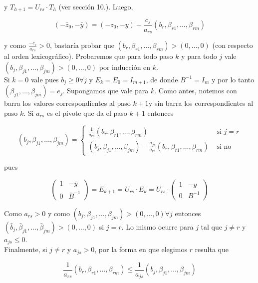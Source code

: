 \documentclass[10pt]{article}
\begin{document}
y $T_{h+1}=U_{r s} \cdot T_{h}$ (ver sección 10.). Luego,

$$
\left(-\bar{z}_{0},-\bar{y}\right)=\left(-z_{0},-y\right)-\frac{c_{s}}{a_{r s}}\left(b_{r}, \beta_{r 1}, \ldots, \beta_{r m}\right)
$$

y como $\frac{-c_{s}}{a_{r s}}>0$, bastaría probar que $\left(b_{r}, \beta_{r 1}, \ldots, \beta_{r m}\right)>(0, \ldots, 0)$ (con respecto al orden lexicográfico). Probaremos que para todo paso $k$ y para todo $j$ vale $\left(b_{j}, \beta_{j 1}, \ldots, \beta_{j m}\right)>(0, \ldots, 0)$ por inducción en $k$.\\
Si $k=0$ vale pues $b_{j} \geq 0 \forall j$ y $E_{k}=E_{0}=I_{m+1}$, de donde $B^{-1}=I_{m}$ y por lo tanto $\left(\beta_{j 1}, \ldots, \beta_{j m}\right)=e_{j}$. Supongamos que vale para $k$. Como antes, notemos con barra los valores correspondientes al paso $k+1 \mathrm{y}$ sin barra los correspondientes al paso $k$. Si $a_{r s}$ es el pivote que da el paso $k+1$ entonces

$$
\left(\bar{b}_{j}, \bar{\beta}_{j 1}, \ldots, \bar{\beta}_{j m}\right)= \begin{cases}\frac{1}{a_{r s}}\left(b_{r}, \beta_{r 1}, \ldots, \beta_{r m}\right) & \text { si } j=r \\ \left(b_{j}, \beta_{j 1}, \ldots, \beta_{j m}\right)-\frac{a_{j s}}{a_{r s}}\left(b_{r}, \beta_{r 1}, \ldots, \beta_{r m}\right) & \text { si no }\end{cases}
$$

pues

$$
\left(\begin{array}{cc}
1 & -\bar{y} \\
0 & \bar{B}^{-1}
\end{array}\right)=E_{k+1}=U_{r s} \cdot E_{k}=U_{r s} \cdot\left(\begin{array}{cc}
1 & -y \\
0 & B^{-1}
\end{array}\right)
$$

Como $a_{r s}>0$ y como $\left(b_{j}, \beta_{j 1}, \ldots, \beta_{j m}\right)>(0, \ldots, 0) \forall j$ entonces $\left(\bar{b}_{j}, \bar{\beta}_{j 1}, \ldots, \bar{\beta}_{j m}\right)>(0, \ldots, 0)$ si $j=r$. Lo mismo ocurre para $j$ tal que $j \neq r$ y $a_{j s} \leq 0$.\\
Finalmente, si $j \neq r$ y $a_{j s}>0$, por la forma en que elegimos $r$ resulta que

$$
\frac{1}{a_{r s}}\left(b_{r}, \beta_{r 1}, \ldots, \beta_{r m}\right) \leq \frac{1}{a_{j s}}\left(b_{j}, \beta_{j 1}, \ldots, \beta_{j m}\right)
$$
\end{document}
